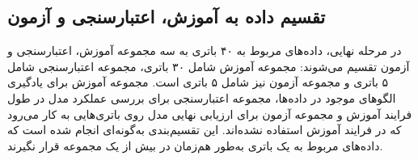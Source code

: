 \subsection{تقسیم داده به آموزش، اعتبارسنجی و آزمون}
\label{sec:split}

در مرحله نهایی، داده‌های مربوط به ۴۰ باتری به سه مجموعه آموزش، اعتبارسنجی و آزمون تقسیم می‌شوند: مجموعه آموزش شامل ۳۰ باتری، مجموعه اعتبارسنجی شامل ۵ باتری و مجموعه آزمون نیز شامل ۵ باتری است. مجموعه آموزش برای یادگیری الگوهای موجود در داده‌ها، مجموعه اعتبارسنجی برای بررسی عملکرد مدل در طول فرایند آموزش و مجموعه آزمون برای ارزیابی نهایی مدل روی باتری‌هایی به کار می‌رود که در فرایند آموزش استفاده نشده‌اند. این تقسیم‌بندی به‌گونه‌ای انجام شده است که داده‌های مربوط به یک باتری به‌طور هم‌زمان در بیش از یک مجموعه قرار نگیرند.
